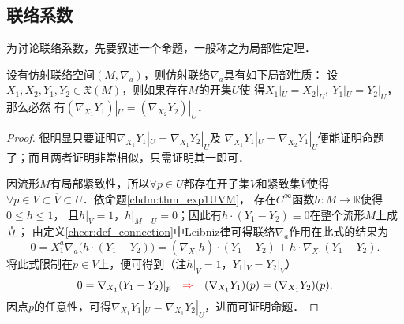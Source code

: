 \subsection{联络系数}
为讨论联络系数，先要叙述一个命题，一般称之为{\heiti 局部性定理}．  
\begin{proposition}\label{chccr:thm_local}
    设有仿射联络空间$(M,\nabla_a)$，则仿射联络$\nabla_a$具有如下{\kaishu 局部性质}：
    设$X_1,X_2,Y_1,Y_2\in \mathfrak{X}(M)$，则如果存在$M$的开集$U$使
    得$X_1|_U =X_2|_U,\ Y_1|_U =Y_2|_U  $，那么必然
    有$(\nabla_{X_1} Y_1) |_U=(\nabla_{X_2} Y_2) |_U$．
\end{proposition}
\begin{proof}
    很明显只要证明$\nabla_{X_1} Y_1 |_U=\nabla_{X_1} Y_2 |_U$及
    $\nabla_{X_1} Y_1 |_U=\nabla_{X_2} Y_1 |_U$便能证明命题了；而且两者证明非常相似，只需证明其一即可．

    因流形$M$有局部紧致性，所以$\forall p\in U$都存在开子集$V$和紧致集$\overline{V}$使得
    $\forall p \in V \subset \overline{V} \subset U$．依命题\ref{chdm:thm_exp1UVM}，
    存在$C^\infty$函数$h:M \to \mathbb{R}$使得$0\leqslant h \leqslant 1$，
    且$h|_V=1$，$h|_{M-U}=0$；因此有$h\cdot(Y_1-Y_2)\equiv 0$在整个流形$M$上成立；
    由定义\ref{chccr:def_connection}中Leibniz律可得联络$\nabla_a$作用在此式的结果为
    \begin{equation*}
        0=X_1^a \nabla_a \bigl( h\cdot(Y_1-Y_2) \bigr) = ( \nabla_{X_1}  h ) \cdot(Y_1-Y_2)
        +h\cdot \nabla_{X_1} (Y_1-Y_2) .
    \end{equation*}
    将此式限制在$p\in V$上，便可得到（注$h|_V=1$，$Y_1|_V =Y_2|_V$）
    \begin{equation*}
        0=\nabla_{X_1} (Y_1-Y_2)|_p 
        \quad {\color{red}\Rightarrow}\quad
        (\nabla_{X_1} Y_1) (p) = (\nabla_{X_1} Y_2) (p) .
    \end{equation*}
    因点$p$的任意性，可得$\nabla_{X_1} Y_1|_U = \nabla_{X_1} Y_2|_U$，进而可证明命题．
\end{proof}




